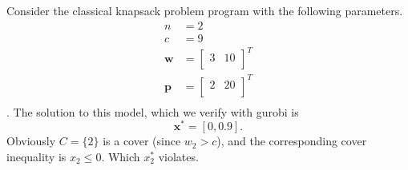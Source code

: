 \documentclass{article}
\title{}
\author{}
\date{}
\begin{document}
Consider the classical knapsack problem program with the following parameters.
\begin{align*}
    n &= 2 \\
    c &= 9\\
    \mathbf{w} &= 
\begin{bmatrix}
    3 & 10 \\
\end{bmatrix}^{T} \\
    \mathbf{p} &= 
\begin{bmatrix}
    2 & 20 \\
\end{bmatrix}^{T} \\
\end{align*}.
The solution to this model, which we verify with gurobi is
\[
    \mathbf{x}^* = [0, 0.9].
\]
Obviously $C = \{2\}$ is a cover (since $w_2 > c$), and the corresponding cover
inequality is $x_2 \leq 0$. Which $x^*_2$ violates.




%
\end{document}
